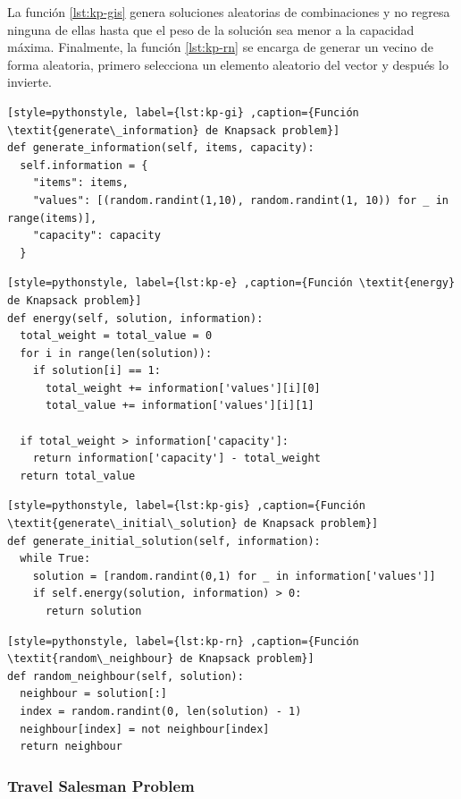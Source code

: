 \documentclass[12pt,twoside]{article}
\begin{document}
	La función \ref{lst:kp-gis} genera soluciones aleatorias de combinaciones y no regresa ninguna de ellas hasta que el peso de la solución sea menor a la capacidad máxima. Finalmente, la función \ref{lst:kp-rn} se encarga de generar un vecino de forma aleatoria, primero selecciona un elemento aleatorio del vector y después lo invierte.  
	
\begin{lstlisting}[style=pythonstyle, label={lst:kp-gi} ,caption={Función \textit{generate\_information} de Knapsack problem}]
def generate_information(self, items, capacity):
  self.information = {
  	"items": items,
  	"values": [(random.randint(1,10), random.randint(1, 10)) for _ in range(items)],
  	"capacity": capacity
  }
\end{lstlisting}

\begin{lstlisting}[style=pythonstyle, label={lst:kp-e} ,caption={Función \textit{energy} de Knapsack problem}]
def energy(self, solution, information):
  total_weight = total_value = 0
  for i in range(len(solution)):
	if solution[i] == 1:
	  total_weight += information['values'][i][0]
	  total_value += information['values'][i][1]

  if total_weight > information['capacity']:
	return information['capacity'] - total_weight
  return total_value
\end{lstlisting}

\begin{lstlisting}[style=pythonstyle, label={lst:kp-gis} ,caption={Función \textit{generate\_initial\_solution} de Knapsack problem}]
def generate_initial_solution(self, information):
  while True:
 	solution = [random.randint(0,1) for _ in information['values']]
	if self.energy(solution, information) > 0:
	  return solution
\end{lstlisting}


\begin{lstlisting}[style=pythonstyle, label={lst:kp-rn} ,caption={Función \textit{random\_neighbour} de Knapsack problem}]
def random_neighbour(self, solution):
  neighbour = solution[:]
  index = random.randint(0, len(solution) - 1)
  neighbour[index] = not neighbour[index]
  return neighbour     
\end{lstlisting}
	
	
	\subsubsection{Travel Salesman Problem}
\end{document}
